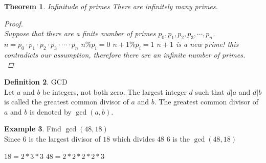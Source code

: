 \documentclass[letterpaper,10pt]{article}
\theoremstyle{plain}
\newtheorem{thm}{Theorem}[section]
\theoremstyle{definition}
\newtheorem{defn}[thm]{Definition}
\newtheorem{exmp}[thm]{Example}
\theoremstyle{remark}
\begin{document}
\begin{thm}{Infinitude of primes} 
There are infinitely many primes.
\begin{proof}
$ $\\
\vspace{1cm}
Suppose that there are a finite number of primes $p_0,p_1,p_2,p_3,\cdots,p_n$.
\newline
$n=p_0\cdot p_1\cdot p_2 \cdot p_3 \cdot\cdots\cdot p_n$
\newline
$n\% p_i=0$
\newline
$n+1\% p_i=1$
\newline
$n+1$ is a new prime! this contradicts our assumption, therefore there are an infinite number of primes.
$ $\\
\end{proof}
\end{thm}
\begin{defn}{GCD}$ $\\
Let $a$ and $b$ be integers, not both zero. The largest integer $d$ such that $d | a$ and $d | b$ is called the greatest common divisor of $a$ and $b$. The greatest common divisor of $a$ and $b$ is denoted by $\gcd(a, b)$.
\end{defn}
\begin{exmp}Find $\gcd(48, 18)$
$ $\\
Since 6 is the largest divisor of $18$ which divides $48$ 6 is the $\gcd(48,18)$

\newline
\noindent
$18=2*3*3$\newline
$48=2*2*2*2*3$
\end{exmp}
\end{document}
